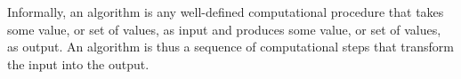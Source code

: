 Informally, an algorithm is any well-deﬁned computational procedure that takes some value, or set of values, as input and produces some value, or set of values, as output. An algorithm is thus a sequence of computational steps that transform the
input into the output.